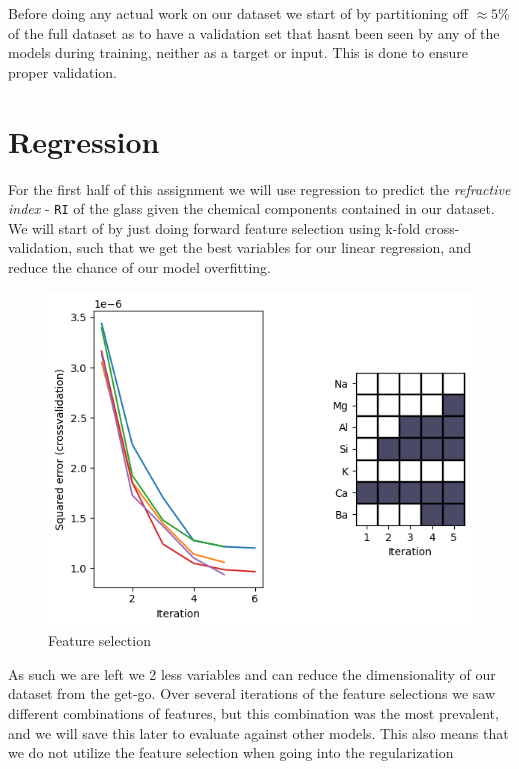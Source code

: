 Before doing any actual work on our dataset we start of by partitioning off $\approx 5\%$ of the full dataset as to have a validation set that hasnt been seen by any of the models during training, neither as a target or input. This is done to ensure proper validation. \color[red]{den her ide er scrapped for nu}

\section{Regression}
For the first half of this assignment we will use regression to predict the \textit{refractive index} - \texttt{RI} of the glass given the chemical components contained in our dataset.\\
We will start of by just doing forward feature selection using k-fold cross-validation, such that we get the best variables for our linear regression, and reduce the chance of our model overfitting.\\
\begin{figure}[H]
    \centering
    \includegraphics[width=12cm]{images/featureselection.png}
    \caption{Feature selection}
    \label{fig:fig_select}
\end{figure}
As such we are left we 2 less variables and can reduce the dimensionality of our dataset from the get-go. Over several iterations of the feature selections we saw different combinations of features, but this combination was the most prevalent, and we will save this later to evaluate against other models. This also means that we do not utilize the feature selection when going into the regularization \\ \color[red]{Er meget usikker på det her, men giver fucking 0 mening at bruge feature selectionen ind i regularization og har kun gjort det fordi rapporten ligger op til det}

